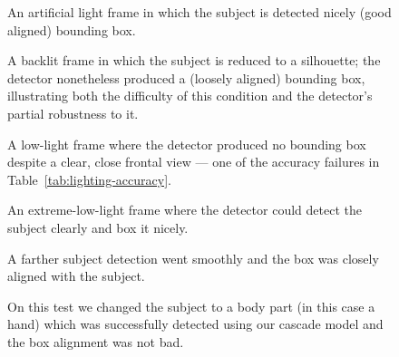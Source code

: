 \begin{figure}[H]
\centering
\caption{An artificial light frame in which the subject is detected nicely (good aligned) bounding box.}\label{fig:artificial-light}
\end{figure}

\begin{figure}[H]
\centering
\caption{A backlit frame in which the subject is reduced to a silhouette; the detector nonetheless produced a (loosely aligned) bounding box, illustrating both the difficulty of this condition and the detector's partial robustness to it.}\label{fig:back-light-hit}
\end{figure}

\begin{figure}[H]
\centering
\caption{A low-light frame where the detector produced no bounding box despite a clear, close frontal view — one of the accuracy failures in Table~\ref{tab:lighting-accuracy}.}\label{fig:low-light-miss}
\end{figure}

\begin{figure}[H]
\centering
\caption{An extreme-low-light frame where the detector could detect the subject clearly and box it nicely.}\label{fig:extreme-low-light}
\end{figure}

\begin{figure}[H]
\centering
\caption{A farther subject detection went smoothly and the box was closely aligned with the subject.}\label{fig:farther}
\end{figure}

\begin{figure}[H]
\centering
\caption{On this test we changed the subject to a body part (in this case a hand) which was successfully detected using our cascade model and the box alignment was not bad.}\label{fig:hand-test}
\end{figure}

